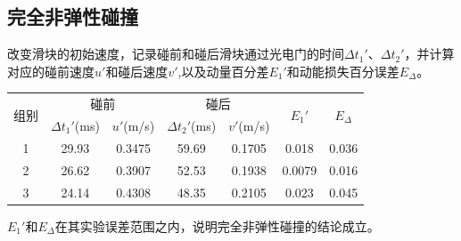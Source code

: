 \documentclass{article}
\begin{document}
\subsection{完全非弹性碰撞}
\hspace*{2em}改变滑块的初始速度，记录碰前和碰后滑块通过光电门的时间$\Delta t_1'、\Delta t_2'$，并计算对应的碰前速度$u'$和碰后速度$v'$,以及动量百分差$E_1'$和动能损失百分误差$E_{\Delta}$。\\
\begin{table}[!h]
    \centering
    \begin{tabular}{ccc|cccc}
    \hline\hline
    \multirow{2}{*}{组别} & \multicolumn{2}{c}{碰前} & \multicolumn{2}{c}{碰后} & \multirow{2}{*}{$E_1'$} & \multirow{2}{*}{$E_{\Delta}$} \\
                        & $\Delta t_1'$(ms)      & $u'$(m/s)            & $\Delta t_2'$(ms)      & $v'$(m/s)            &                     &                     \\
                        1                   & 29.93                  & 0.3475           & 59.69                  & 0.1705           & 0.018                            & 0.036                             \\
                        2                   & 26.62                  & 0.3907            & 52.53                  & 0.1938           & 0.0079                             & 0.016                              \\
                        3                   & 24.14                  & 0.4308           & 48.35                  & 0.2105           & 0.023                             & 0.045                            \\
    \hline\hline
    \end{tabular}
\end{table}
\hspace*{2em}$E_1'$和$E_\Delta$在其实验误差范围之内，说明完全非弹性碰撞的结论成立。
\end{document}
